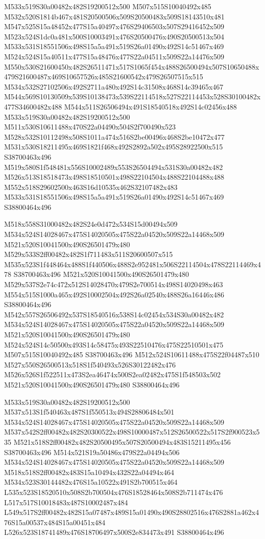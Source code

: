 \documentclass{article}
\begin{document}
\begin{multicols}{2}
M533x519S30a00482x482S19200512x500 M507x515S10040492x485 M532x520S1814b467x481S20500506x509S20500483x509S18143510x481 M547x525S15a48452x477S15a40497x476S29406503x507S29416452x509 M523x524S1dc0a481x500S10003491x476S20500476x490S20500513x504 M533x531S18551506x498S15a5a491x519S26a01490x492S14c51467x469 M524x524S15a40511x477S15a48476x477S22a04511x509S22a14476x509 M550x530S21600450x482S26511471x517S1065f454x488S26500494x507S10650488x479S21600487x469S10657526x485S21600542x479S26507515x515 M534x532S27102506x492S2711a480x492S14c31508x468S14c39465x467 M544x569S10130509x539S10138473x539S22114518x527S22114453x528S30100482x477S34600482x488 M544x511S26506494x491S18540518x492S14c02456x488 M533x519S30a00482x482S19200512x500 M511x530S10611488x470S22a04490x504S2f700490x523 M528x532S10112498x508S1011a474x516S2be00496x468S2be10472x477 M531x530S18211495x469S1821f468x492S2892a502x495S28922500x515 S38700463x496 M519x580S1f548481x556S10002489x553S26504494x531S30a00482x482 M526x513S18518473x498S18510501x498S22104504x488S22104488x488 M552x518S29602500x463S16d10535x462S32107482x483 M533x531S18551506x498S15a5a491x519S26a01490x492S14c51467x469 S38800464x496

M518x558S31000482x482S24e0d472x534S15d00494x509 M534x524S14028467x475S14020505x475S22a04520x509S22a14468x509 M521x520S10041500x490S26501479x480 M529x533S2ff00482x482S1f711483x511S20600507x515 M535x523S1f448464x488S1f440506x488S2e952481x506S22114504x478S22114469x478 S38700463x496 M521x520S10041500x490S26501479x480 M529x537S2e74c472x512S14028470x479S2e700514x498S14020498x463 M554x515S1000a465x492S10002504x492S26a02540x488S26a16446x486 S38800464x496 M542x557S26506492x537S18540516x538S14c02454x534S30a00482x482 M534x524S14028467x475S14020505x475S22a04520x509S22a14468x509 M521x520S10041500x490S26501479x480 M524x524S14c50500x493S14c58475x493S22510476x475S22510501x475 M507x515S10040492x485 S38700463x496 M512x524S10611488x475S22f04487x510 M527x550S26500513x518S1f540493x526S30122482x476 M526x526S1f522511x473S2ea46474x500S2ea02482x475S1f548503x502 M521x520S10041500x490S26501479x480 S38800464x496

M533x519S30a00482x482S19200512x500 M537x513S1f540463x487S1f550513x494S28806484x501 M534x524S14028467x475S14020505x475S22a04520x509S22a14468x509 M537x542S2ff00482x482S20300522x498S10000487x512S26500522x517S2f900523x535 M521x518S2ff00482x482S20500495x507S20500494x483S15211495x456 S38700463x496 M514x521S19a50486x479S22a04494x506 M534x524S14028467x475S14020505x475S22a04520x509S22a14468x509 M518x518S2ff00482x483S15a10494x432S22a04494x464 M534x523S30144482x476S15a10522x491S2b700515x464 L535x523S18520510x508S2b700504x476S18528464x508S2b711474x476 L517x517S10018483x487S10002487x484 L549x517S2ff00482x482S15a07487x489S15a01490x490S28802516x476S2881a462x476S15a00537x484S15a00451x484 L526x523S18741489x476S18706497x500S2e834473x491 S38800464x496


\end{multicols}
\end{document}
